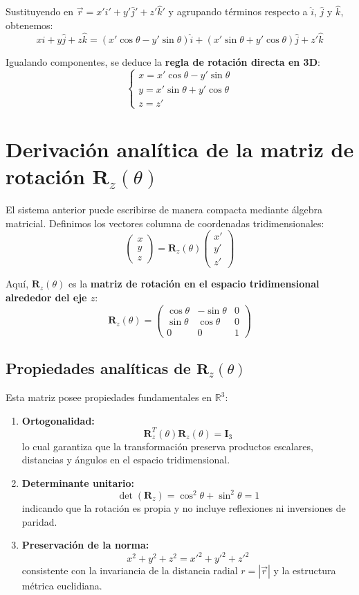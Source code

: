 Sustituyendo en $\vec{r} = x'\hat{i}' + y'\hat{j}' + z'\hat{k}'$ y agrupando términos respecto a $\hat{i}$, $\hat{j}$ y $\hat{k}$, obtenemos:
$$ x\hat{i} + y\hat{j} + z\hat{k} = (x'\cos\theta - y'\sin\theta)\hat{i} + (x'\sin\theta + y'\cos\theta)\hat{j} + z'\hat{k} $$

Igualando componentes, se deduce la \textbf{regla de rotación directa en 3D}:
$$ \begin{cases} 
 x = x'\cos\theta - y'\sin\theta \\ 
 y = x'\sin\theta + y'\cos\theta \\ 
 z = z' 
\end{cases} $$

\section{Derivación analítica de la matriz de rotación \texorpdfstring{$\mathbf{R}_z(\theta)$}{Rz(theta)}}
El sistema anterior puede escribirse de manera compacta mediante álgebra matricial. Definimos los vectores columna de coordenadas tridimensionales:
$$ \begin{pmatrix} x \\ y \\ z \end{pmatrix} = \mathbf{R}_z(\theta)\begin{pmatrix} x' \\ y' \\ z' \end{pmatrix} $$

Aquí, $\mathbf{R}_z(\theta)$ es la \textbf{matriz de rotación en el espacio tridimensional alrededor del eje $z$}:
$$ \mathbf{R}_z(\theta) = \begin{pmatrix} 
\cos\theta & -\sin\theta & 0 \\ 
\sin\theta & \cos\theta & 0 \\ 
0 & 0 & 1 
\end{pmatrix} $$

\subsection{Propiedades analíticas de \texorpdfstring{$\mathbf{R}_z(\theta)$}{Rz(theta)}}
Esta matriz posee propiedades fundamentales en $\mathbb{R}^3$:
\begin{enumerate}
    \item \textbf{Ortogonalidad:}
$$ \mathbf{R}_z^T(\theta)\mathbf{R}_z(\theta) = \mathbf{I}_3 $$
    lo cual garantiza que la transformación preserva productos escalares, distancias y ángulos en el espacio tridimensional.
    \item \textbf{Determinante unitario:}
$$ \det(\mathbf{R}_z) = \cos^2\theta + \sin^2\theta = 1 $$
    indicando que la rotación es propia y no incluye reflexiones ni inversiones de paridad.
    \item \textbf{Preservación de la norma:}
$$ x^2 + y^2 + z^2 = x'^2 + y'^2 + z'^2 $$
    consistente con la invariancia de la distancia radial $r = |\vec{r}|$ y la estructura métrica euclidiana.
\end{enumerate}

